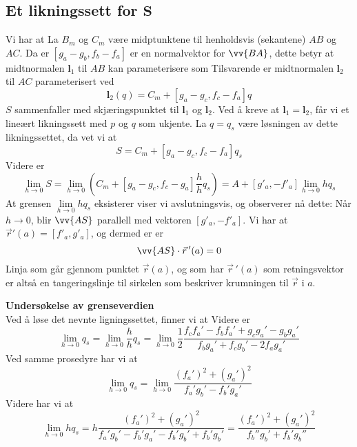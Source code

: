 \subsection*{Et likningssett for $\bm S $}
Vi har at
La $ B_m $ og $ C_m $ være midptunktene til henholdsvis  (sekantene) $ AB $ og $ AC $. Da er
$ [g_a-g_b,f_b-f_a] $ er en normalvektor for $ \vv{BA} $, dette betyr at midtnormalen $\bm l_1 $ til $ AB $ kan parameterisere som
Tilsvarende er midtnormalen $\bm l_2 $ til $ AC $ parameterisert ved
\[ {\bm l_2(q)}=C_m+[g_a-g_c,f_c-f_a] q \]
$ S $ sammenfaller med skjæringspunktet til $\bm l_1 $ og $\bm l_2 $.
Ved å kreve at $\bm l_1= \bm l_2 $, får vi et lineært likningssett med $ p $ og $ q $ som ukjente. La $ q=q_s $ være løsningen av dette likningssettet, da vet vi at
\[ S=C_m+[g_a-g_c, f_c-f_a]q_s\]
Videre er
\[ \lim\limits_{h\to0}S=\lim\limits_{h\to0}\left(C_m+[g_a-g_c, f_c-g_a]\frac{h}{h}q_s\right)=A+[g'_a, -f'_a]\lim\limits_{h\to 0}h q_s \]
At grensen $ \lim\limits_{h\to 0}h q_s $ eksisterer viser vi avslutningsvis, og observerer nå dette: Når $ h\to0 $, blir $ \vv{AS} $ parallell med vektoren $ [g'_a, -f'_a] $. Vi har at $ \vec{r}'(a)=[f'_a, g'_a] $, og dermed er er 
\[ \vv{AS}\cdot \vec{r}\,'(a)=0 \]
Linja som går gjennom punktet $ \vec{r}(a) $, og som har $ \vec{r}\,'(a) $ som retningsvektor er altså en tangeringslinje til sirkelen som beskriver krumningen til $ \vec{r} $ i $ a $. \vsk

\textbf{Undersøkelse av grenseverdien} \\
Ved å løse det nevnte ligningssettet, finner vi at
Videre er
\[ \lim\limits_{h\to 0} q_s=\lim\limits_{h\to 0}\frac{h}{h}q_s=\lim\limits_{h\to 0}\frac{1}{2}\frac{f_cf_a'-f_bf_a'+g_cg_a'-g_bg_a'}{f_bg_a'+f_cg_b'-2f_ag_a'} \]
Ved samme prosedyre har vi at
\[\lim\limits_{h\to 0}q_s= \lim\limits_{h\to 0} \frac{(f_a')^2+(g_a')^2}{f_a'g_b'-f_b'g_a'} \]
Videre har vi at
\[ \lim\limits_{h\to 0}h q_s= h\frac{(f_a')^2+(g_a')^2}{f_a'g_b'-f_b'g_a'-f_b'g_b'+f_b'g_b'}= \frac{(f_a')^2+(g_a')^2}{f_b''g_b'+f_b'g_b''} \]
